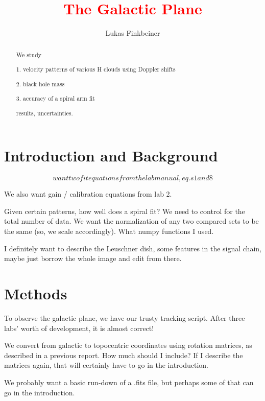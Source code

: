 \documentclass[12pt]{article}
\title{\textcolor{red}{The Galactic Plane}}
\author{Lukas Finkbeiner}
\begin{document}
\maketitle

\begin{abstract}

We study

1. velocity patterns of various H clouds using Doppler shifts

2. black hole mass

3. accuracy of a spiral arm fit

results, uncertainties.

\end{abstract}

\section{Introduction and Background}

\begin{equation}
want two fit equations from the lab manual, eq.s 1 and 8
\end{equation}

We also want gain / calibration equations from lab 2.

Given certain patterns, how well does a spiral fit? We need to control for the total number of data. We want the normalization of any two compared sets to be the same (so, we scale accordingly). What numpy functions I used.

I definitely want to describe the Leuschner dish, some features in the signal chain, maybe just borrow the whole image and edit from there.

\section{Methods}

\quad \quad To observe the galactic plane, we have our trusty tracking script. After three labs' worth of development, it is almost correct!

We convert from galactic to topocentric coordinates using rotation matrices, as described in a previous report. How much should I include? If I describe the matrices again, that will certainly have to go in the introduction.

We probably want a basic run-down of a .fits file, but perhaps some of that can go in the introduction.
\end{document}
